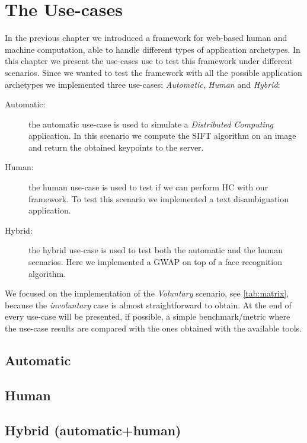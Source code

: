 
\chapter{The Use-cases}
\label{cap:cases}




In the previous chapter we introduced a framework for web-based human and machine
computation, able to handle different types of application archetypes. In this
chapter we present the use-cases use to test this framework under different
scenarios. Since we wanted to test the framework with all the possible application
archetypes we implemented three use-cases: \emph{Automatic}, \emph{Human} and
\emph{Hybrid}:
\begin{description}
    \item[Automatic:] the automatic use-case is used to simulate a
    \emph{Distributed Computing} application. In this scenario we compute the
    SIFT algorithm on an image and return the obtained keypoints to the server.
    \item[Human:] the human use-case is used to test if we can perform \acl{HC}
    with our framework. To test this scenario we implemented a text disambiguation
    application.
    \item[Hybrid:] the hybrid use-case is used to test both the automatic and the
    human scenarios. Here we implemented a \ac{GWAP} on top of a face recognition
    algorithm.
\end{description}
\noindent We focused on the implementation of the \emph{Voluntary} scenario, see
\autoref{tab:matrix}, because the \emph{involuntary} case is almost straightforward
to obtain.
At the end of every use-case will be presented, if possible, a simple
benchmark/metric where the use-case results are compared with the ones obtained
with the available tools. 



\section{Automatic}
\label{sec:cases:automatic}


\section{Human}
\label{sec:cases:human}



\section{Hybrid (automatic+human)}
\label{sec:cases:hybrid}
